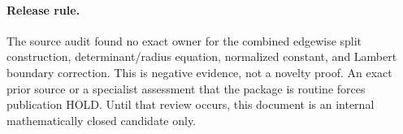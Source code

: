 \paragraph{Release rule.}
The source audit found no exact owner for the combined edgewise split
construction, determinant/radius equation, normalized constant, and Lambert
boundary correction.  This is negative evidence, not a novelty proof.
An exact prior source or a specialist assessment that the package is routine
forces publication HOLD.  Until that review occurs, this document is an
internal mathematically closed candidate only.

